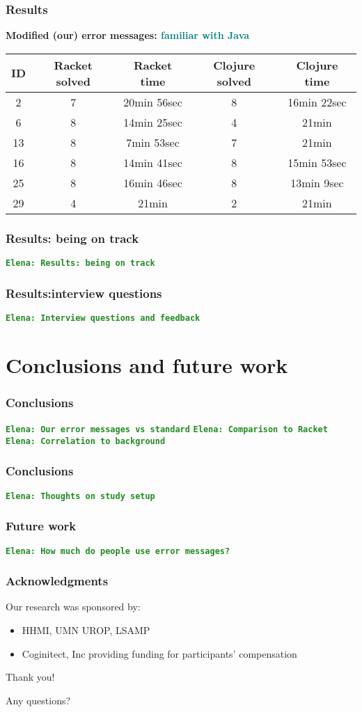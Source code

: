 \documentclass{beamer}
\newcommand{\comment}[1]{{\bf \tt  {#1}}}
\newcommand{\emcomment}[1]{\textcolor{ForestGreen}{\comment{Elena: {#1}}}}
\newcommand{\Java}[1]{\textcolor{Teal}{\bf {#1}}}
\begin{document}
\begin{frame}
\frametitle{Results}
{\bf Modified (our) error messages:  \Java{familiar with Java}}
\vspace{0.1in}

\begin{tabular}{c | c| c| c | c }
\hline
{\bf ID} & {\bf Racket solved} & {\bf Racket time} & {\bf Clojure solved} & {\bf Clojure time} \\
\hline 
2 & 7  & 20min 56sec & 8 & 16min 22sec  \\
6 &  8  & 14min 25sec &  4  &  21min \\
13 &  8 & 7min 53sec &  7 &  21min \\
16 &  8  & 14min 41sec &  8  &  15min 53sec \\
25 &  8  & 16min 46sec &  8  &  13min 9sec \\
29 &  4  & 21min &  2  &  21min \\
\hline
\end{tabular}
\end{frame}

\begin{frame}
\frametitle{Results: being on track}
\emcomment{Results: being on track}
\end{frame}

\begin{frame}
\frametitle{Results:interview questions}
\emcomment{Interview questions and feedback}
\end{frame}

\section{Conclusions and future work}

\frametitle{Conclusions}
\begin{frame}
\emcomment{Our error messages vs standard}
\emcomment{Comparison to Racket}
\emcomment{Correlation to background}
\end{frame}

\begin{frame}
\frametitle{Conclusions}
\emcomment{Thoughts on study setup}
\end{frame}

\begin{frame}
\frametitle{Future work}
\emcomment{How much do people use error messages?}
\end{frame}

\begin{frame}
\frametitle{Acknowledgments}
	Our research was sponsored by:
	\begin{itemize}
	\item HHMI, UMN UROP, LSAMP
        \item Coginitect, Inc providing funding for participants' compensation 
	\end{itemize}
	{\centering
	\noindent
	Thank you! \par
	Any questions? \par
	}
\end{frame}
\end{document}
